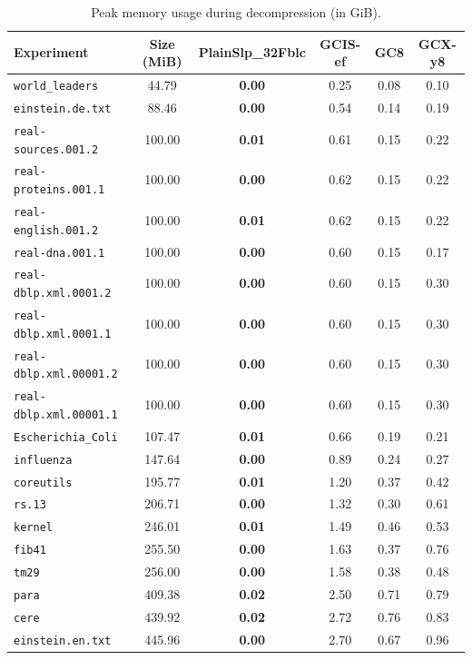 \begin{table}[t]
\caption{Peak memory usage during decompression (in GiB). }
\label{t:memory-decompression}
\centering
\setlength{\tabcolsep}{5pt}
\begin{tabular}{|l|c|c|c|c|c|}
\hline
Experiment & Size (MiB) & PlainSlp_32Fblc & GCIS-ef & GC8 & GCX-y8 \\
\hline
\texttt{world_leaders} & 44.79 & \textbf{0.00} & 0.25 & 0.08 & 0.10 \\
\texttt{einstein.de.txt} & 88.46 & \textbf{0.00} & 0.54 & 0.14 & 0.19 \\
\texttt{real-sources.001.2} & 100.00 & \textbf{0.01} & 0.61 & 0.15 & 0.22 \\
\texttt{real-proteins.001.1} & 100.00 & \textbf{0.00} & 0.62 & 0.15 & 0.22 \\
\texttt{real-english.001.2} & 100.00 & \textbf{0.01} & 0.62 & 0.15 & 0.22 \\
\texttt{real-dna.001.1} & 100.00 & \textbf{0.00} & 0.60 & 0.15 & 0.17 \\
\texttt{real-dblp.xml.0001.2} & 100.00 & \textbf{0.00} & 0.60 & 0.15 & 0.30 \\
\texttt{real-dblp.xml.0001.1} & 100.00 & \textbf{0.00} & 0.60 & 0.15 & 0.30 \\
\texttt{real-dblp.xml.00001.2} & 100.00 & \textbf{0.00} & 0.60 & 0.15 & 0.30 \\
\texttt{real-dblp.xml.00001.1} & 100.00 & \textbf{0.00} & 0.60 & 0.15 & 0.30 \\
\texttt{Escherichia_Coli} & 107.47 & \textbf{0.01} & 0.66 & 0.19 & 0.21 \\
\texttt{influenza} & 147.64 & \textbf{0.00} & 0.89 & 0.24 & 0.27 \\
\texttt{coreutils} & 195.77 & \textbf{0.01} & 1.20 & 0.37 & 0.42 \\
\texttt{rs.13} & 206.71 & \textbf{0.00} & 1.32 & 0.30 & 0.61 \\
\texttt{kernel} & 246.01 & \textbf{0.01} & 1.49 & 0.46 & 0.53 \\
\texttt{fib41} & 255.50 & \textbf{0.00} & 1.63 & 0.37 & 0.76 \\
\texttt{tm29} & 256.00 & \textbf{0.00} & 1.58 & 0.38 & 0.48 \\
\texttt{para} & 409.38 & \textbf{0.02} & 2.50 & 0.71 & 0.79 \\
\texttt{cere} & 439.92 & \textbf{0.02} & 2.72 & 0.76 & 0.83 \\
\texttt{einstein.en.txt} & 445.96 & \textbf{0.00} & 2.70 & 0.67 & 0.96 \\
\hline
\end{tabular}
\end{table}